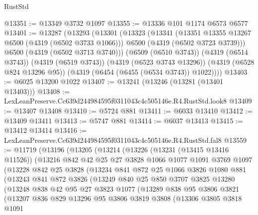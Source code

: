 \begin{lexlean}{RustStd}
\begin{coremodule}
@13351 := @13349 @3732 @1097
@13355 := @13336 @101 @1174 @6573 @6577
@13401 := @13287
    (@13293
      (@13301
        (@13323
          (@13341
            (@13351 @13355 @13267 @6500 (@4319 (@6502 @3733 @1066)))
            @6500
            (@4319 (@6502 @3723 @3739)))
          @6500
          (@4319 (@6502 @3713 @3740)))
        (@6509 (@6510 @3743))
        (@4319 (@6514 @3743))
        (@4319 (@6519 @3743))
        (@4319 (@6523 @3743 @13296))
        (@4319 (@6528 @824 @13296 @95))
        (@4319 (@6454 (@6455 (@6534 @3743)) @1022))))
@13403 := @6025 @13200 @1022
@13407 := @13241 (@13246 (@13281 (@13401 @13403)))
@13408 := LexLeanPreserve.Cc639d244984595f0311043c4c505146e.R4.RustStd.look8
@13409 := @13407 @13408
@13410 := @5724 @881
@13411 := @6033 @13410
@13412 := @13409 @13411
@13413 := @5747 @881
@13414 := @6037 @13413
@13415 := @13412 @13414
@13416 := LexLeanPreserve.Cc639d244984595f0311043c4c505146e.R4.RustStd.fal8
@13559 := @11719
    (@13196
      (@13205
        (@13214
          (@13226
            (@13231 (@13415 @13416 @11526))
            (@13216
              @842
              @42
              @25
              @27
              @3828
              @1066
              @1077
              @1091
              @3769
              @1097
              (@13228
                @842
                @25
                @3828
                (@13234
                  @841
                  @872
                  @25
                  @1066
                  @3826
                  @1080
                  @881
                  (@13243
                    @841
                    @872
                    @3826
                    (@13249
                      @840
                      @25
                      @850
                      @3707
                      @3825
                      @13280
                      (@13248
                        @838
                        @42
                        @95
                        @27
                        @3823
                        @1077
                        (@13289
                          @838
                          @95
                          @3806
                          @3821
                          (@13207
                            @836
                            @829
                            @13296
                            @95
                            @3806
                            @3819
                            @3808
                            (@13306
                              @3805
                              @3818
                              @1091

\end{coremodule}
\end{lexlean}

